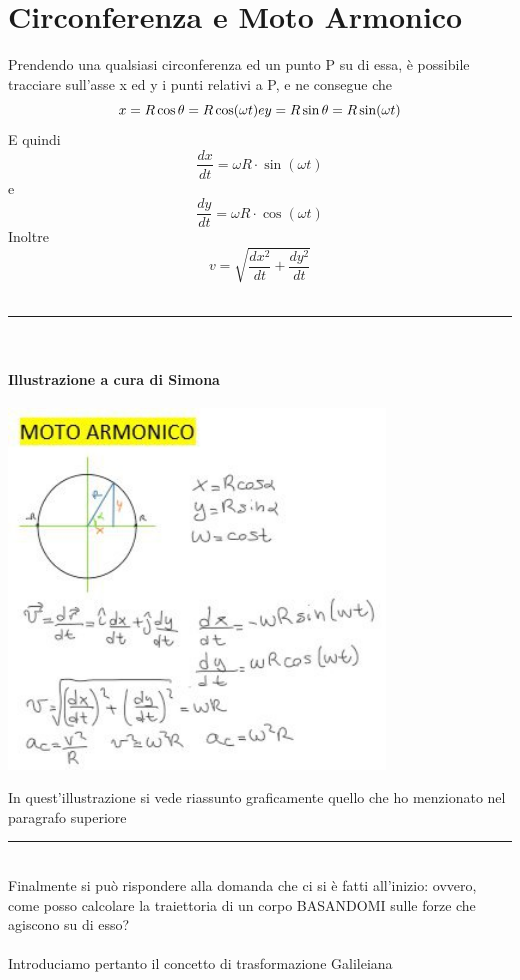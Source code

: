 \documentclass[12pt, a4paper, openany, oneside]{book}
\begin{document}
\section{Circonferenza e Moto Armonico}
Prendendo una qualsiasi circonferenza ed un punto P su di essa, è possibile 
tracciare sull'asse x ed y i punti relativi a P, e ne consegue che
\[x = R\cos \theta = R\cos(\omega t) e \\
y = R\sin \theta = R\sin(\omega t) \] 
E quindi 
\[\frac{dx}{dt} = \omega R \cdot \sin(\omega t) \] e
\[\frac{dy}{dt} = \omega R \cdot \cos(\omega t) \]
Inoltre \[v = \sqrt{\frac{dx^{2}}{dt} + \frac{dy^{2}}{dt}} \]
\\
{\color{black} \rule{\linewidth}{0.3mm} }
\\
\paragraph{Illustrazione a cura di Simona}
\begin{center}
\includegraphics[width=0.75\textwidth]{motoarmonico}
\end{center}
In quest'illustrazione si vede riassunto graficamente quello che ho menzionato
nel paragrafo superiore \\
{\color{black} \rule{\linewidth}{0.3mm} }
\\
Finalmente si può rispondere alla domanda che ci si è fatti all'inizio: ovvero,
come posso calcolare la traiettoria di un corpo BASANDOMI sulle forze che 
agiscono su di esso?\\ \\ 
Introduciamo pertanto il concetto di trasformazione Galileiana
\end{document}

